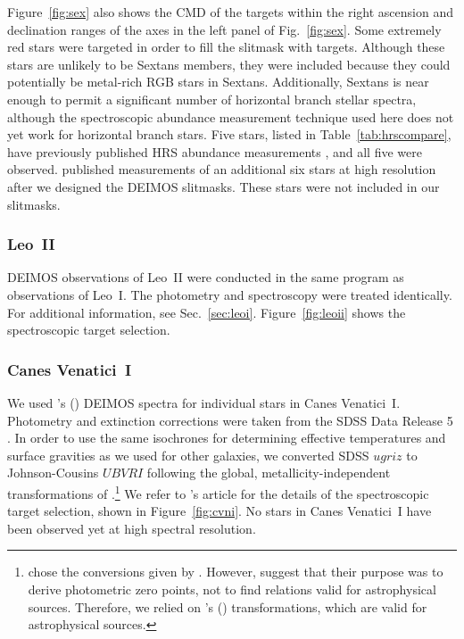\documentclass{emulateapj}
\begin{document}
Figure~\ref{fig:sex} also shows the CMD of the targets within the
right ascension and declination ranges of the axes in the left panel
of Fig.~\ref{fig:sex}.  Some extremely red stars were targeted in
order to fill the slitmask with targets.  Although these stars are
unlikely to be Sextans members, they were included because they could
potentially be metal-rich RGB stars in Sextans.  Additionally, Sextans
is near enough to permit a significant number of horizontal branch
stellar spectra, although the spectroscopic abundance measurement
technique used here does not yet work for horizontal branch stars.
Five stars, listed in Table~\ref{tab:hrscompare}, have previously
published HRS abundance measurements \citep{she01a}, and all five were
observed.  \citet{aok09} published measurements of an additional six
stars at high resolution after we designed the DEIMOS slitmasks.
These stars were not included in our slitmasks.

\subsubsection{Leo~II}

DEIMOS observations of Leo~II were conducted in the same program as
observations of Leo~I.  The photometry and spectroscopy were treated
identically.  For additional information, see Sec.~\ref{sec:leoi}.
Figure~\ref{fig:leoii} shows the spectroscopic target selection.

\subsubsection{Canes Venatici~I}

We used \citeauthor{sim07}'s (\citeyear{sim07}) DEIMOS spectra for
individual stars in Canes Venatici~I.  Photometry and extinction
corrections were taken from the SDSS Data Release 5 \citep{ade07}.  In
order to use the same isochrones for determining effective
temperatures and surface gravities as we used for other galaxies, we
converted SDSS $ugriz$ to Johnson-Cousins $UBVRI$ following the
global, metallicity-independent transformations of
\citet{jor06}.\footnote{\citet{kir08b} chose the conversions given by
  \citet{cho08}.  However, \citeauthor{cho08} suggest that their
  purpose was to derive photometric zero points, not to find relations
  valid for astrophysical sources.  Therefore, we relied on
  \citeauthor{jor06}'s (\citeyear{jor06}) transformations, which are
  valid for astrophysical sources.}  We refer to \citeauthor{sim07}'s
article for the details of the spectroscopic target selection, shown
in Figure~\ref{fig:cvni}.  No stars in Canes Venatici~I have been
observed yet at high spectral resolution.
\end{document}
